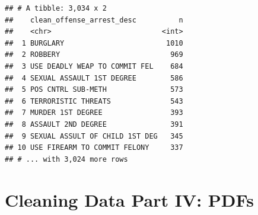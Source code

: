 \documentclass[]{book}
\begin{document}
\begin{verbatim}
## # A tibble: 3,034 x 2
##    clean_offense_arrest_desc          n
##    <chr>                          <int>
##  1 BURGLARY                        1010
##  2 ROBBERY                          969
##  3 USE DEADLY WEAP TO COMMIT FEL    684
##  4 SEXUAL ASSAULT 1ST DEGREE        586
##  5 POS CNTRL SUB-METH               573
##  6 TERRORISTIC THREATS              543
##  7 MURDER 1ST DEGREE                393
##  8 ASSAULT 2ND DEGREE               391
##  9 SEXUAL ASSULT OF CHILD 1ST DEG   345
## 10 USE FIREARM TO COMMIT FELONY     337
## # ... with 3,024 more rows
\end{verbatim}

\hypertarget{cleaning-data-part-iv-pdfs}{%
\chapter{Cleaning Data Part IV: PDFs}\label{cleaning-data-part-iv-pdfs}}
\end{document}
